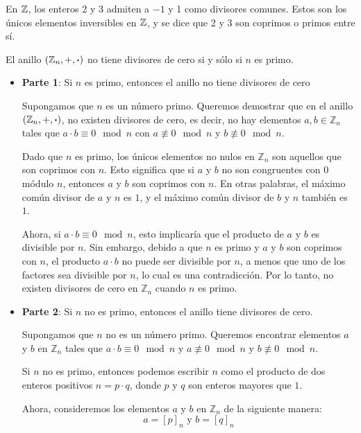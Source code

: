 En $\mathbb{Z}$, los enteros 2 y 3 admiten a $-1$ y 1 como divisores comunes. Estos son los únicos elementos inversibles en $\mathbb{Z}$, y se dice que 2 y 3 son coprimos o primos entre sí.

\begin{fmd-theorem} \label{teo:primo}
	El anillo $(\mathbb{Z}_n, +, \boldsymbol{\cdot})$ no tiene divisores de cero si y sólo si $n$ es primo.
\end{fmd-theorem}
\begin{fmd-proof}
	
	\begin{itemize}
		\item \textbf{Parte 1}: Si $n$ es primo, entonces el anillo no tiene divisores de cero
		
		Supongamos que $n$ es un número primo. Queremos demostrar que en el anillo $(\mathbb{Z}_n, +, \boldsymbol{\cdot})$, no existen divisores de cero, es decir, no hay elementos $a, b \in \mathbb{Z}_n$ tales que $a \cdot b \equiv 0 \mod n$ con $a \not\equiv 0 \mod n$ y $b \not\equiv 0 \mod n$.
		
		Dado que $n$ es primo, los únicos elementos no nulos en $\mathbb{Z}_n$ son aquellos que son coprimos con $n$. Esto significa que si $a$ y $b$ no son congruentes con $0$ módulo $n$, entonces $a$ y $b$ son coprimos con $n$. En otras palabras, el máximo común divisor de $a$ y $n$ es $1$, y el máximo común divisor de $b$ y $n$ también es $1$.
		
		Ahora, si $a \cdot b \equiv 0 \mod n$, esto implicaría que el producto de $a$ y $b$ es divisible por $n$. Sin embargo, debido a que $n$ es primo y $a$ y $b$ son coprimos con $n$, el producto $a \cdot b$ no puede ser divisible por $n$, a menos que uno de los factores sea divisible por $n$, lo cual es una contradicción. Por lo tanto, no existen divisores de cero en $\mathbb{Z}_n$ cuando $n$ es primo.
		
		\item \textbf{Parte 2}: Si $n$ no es primo, entonces el anillo tiene divisores de cero.
		
		Supongamos que $n$ no es un número primo. Queremos encontrar elementos $a$ y $b$ en $\mathbb{Z}_n$ tales que $a \cdot b \equiv 0 \mod n$ y $a \not\equiv 0 \mod n$ y $b \not\equiv 0 \mod n$.
		
		Si $n$ no es primo, entonces podemos escribir $n$ como el producto de dos enteros positivos $n = p \cdot q$, donde $p$ y $q$ son enteros mayores que $1$.
		
		Ahora, consideremos los elementos $a$ y $b$ en $\mathbb{Z}_n$ de la siguiente manera:
		\[a = [p]_n \mbox{ y } b = [q]_n\]
		

\end{itemize}
\end{fmd-proof}
